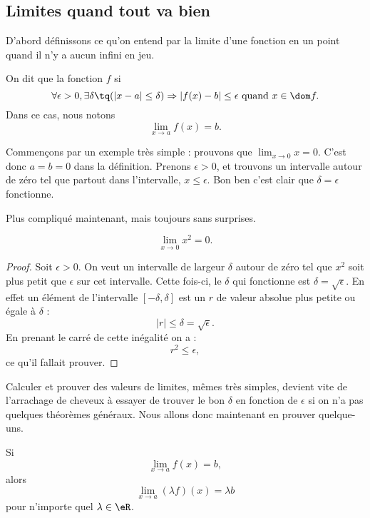 \subsection{Limites quand tout va bien}

D'abord définissons ce qu'on entend par la limite d'une fonction en un point quand il n'y a aucun infini en jeu.
\begin{definition}      \label{DefLimPointSansInfini}
 On dit que la fonction $f$  si 
\[ 
  \forall \epsilon>0,\exists\delta\tq (| x-a |\leq\delta)\Rightarrow | f(x)-b |\leq \epsilon\text{ quand }x\in\dom f.
\]
Dans ce cas, nous notons
\begin{equation}
\lim_{x\to a}f(x)=b.
\end{equation} 
\end{definition}

Commençons par un exemple très simple : prouvons que $\lim_{x\to 0}x=0$. C'est donc $a=b=0$ dans la définition. Prenons $\epsilon>0$, et trouvons un intervalle autour de zéro tel que partout dans l'intervalle, $x\leq \epsilon$. Bon ben c'est clair que $\delta=\epsilon$ fonctionne.

Plus compliqué maintenant, mais toujours sans surprises.

\begin{proposition}
\[ 
  \lim_{x\to 0}x^2=0.
\]

\end{proposition}

\begin{proof}
Soit $\epsilon>0$. On veut un intervalle de largeur $\delta$ autour de zéro tel que $x^2$ soit plus petit que $\epsilon$ sur cet intervalle. Cette fois-ci, le $\delta$ qui fonctionne est $\delta=\sqrt{\epsilon}$. En effet un élément de l'intervalle $[-\delta,\delta]$ est un $r$ de valeur absolue plus petite ou égale à $\delta$ : 
\[ 
| r |\leq\delta=\sqrt{\epsilon}.
\]
En prenant le carré de cette inégalité on a :
\[ 
  r^2\leq\epsilon,
\]
ce qu'il fallait prouver.
\end{proof}


Calculer et prouver des valeurs de limites, mêmes très simples, devient vite de l'arrachage de cheveux à essayer de trouver le bon $\delta$ en fonction de $\epsilon$ si on n'a pas quelques théorèmes généraux. Nous allons donc maintenant en prouver quelque-uns.

\begin{theorem}     \label{ThoLimLinMul}
    Si
    \begin{equation} \label{Eqhypmullimlin}
      \lim_{x\to a}f(x)=b,
    \end{equation}
    alors
    \begin{equation} \label{Eqbutmultlim}
      \lim_{x\to a}(\lambda f)(x)=\lambda b
    \end{equation}
    pour n'importe quel $\lambda\in\eR$.
\end{theorem}

